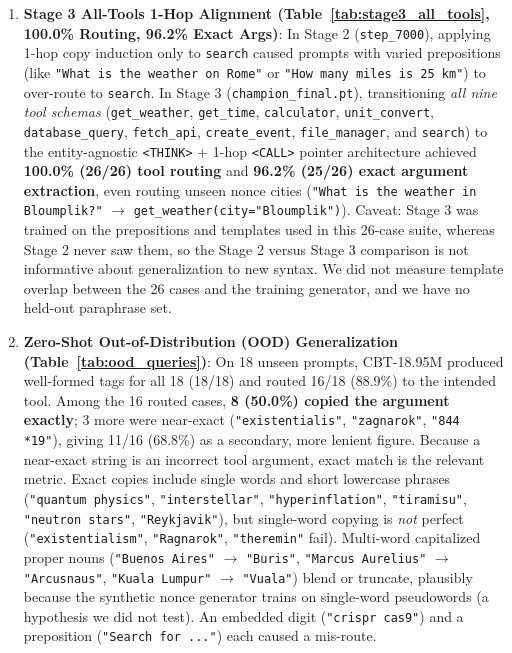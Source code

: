 \documentclass[10pt,twocolumn]{article}
\begin{document}
\begin{enumerate}[leftmargin=*,nosep]
    \item \textbf{Stage 3 All-Tools 1-Hop Alignment (Table~\ref{tab:stage3_all_tools}, 100.0\% Routing, 96.2\% Exact Args)}: In Stage 2 (\texttt{step\_7000}), applying 1-hop copy induction only to \texttt{search} caused prompts with varied prepositions (like \texttt{"What is the weather on Rome"} or \texttt{"How many miles is 25 km"}) to over-route to \texttt{search}. In Stage 3 (\texttt{champion\_final.pt}), transitioning \emph{all nine tool schemas} (\texttt{get\_weather}, \texttt{get\_time}, \texttt{calculator}, \texttt{unit\_convert}, \texttt{database\_query}, \texttt{fetch\_api}, \texttt{create\_event}, \texttt{file\_manager}, and \texttt{search}) to the entity-agnostic \texttt{<THINK>} + 1-hop \texttt{<CALL>} pointer architecture achieved \textbf{100.0\% (26/26) tool routing} and \textbf{96.2\% (25/26) exact argument extraction}, even routing unseen nonce cities (\texttt{"What is the weather in Bloumplik?"} $\to$ \texttt{get\_weather(city="Bloumplik")}). Caveat: Stage 3 was trained on the prepositions and templates used in this 26-case suite, whereas Stage 2 never saw them, so the Stage 2 versus Stage 3 comparison is not informative about generalization to new syntax. We did not measure template overlap between the 26 cases and the training generator, and we have no held-out paraphrase set.
    \item \textbf{Zero-Shot Out-of-Distribution (OOD) Generalization (Table~\ref{tab:ood_queries})}: On 18 unseen prompts, CBT-18.95M produced well-formed tags for all 18 (18/18) and routed 16/18 (88.9\%) to the intended tool. Among the 16 routed cases, \textbf{8 (50.0\%) copied the argument exactly}; 3 more were near-exact (\texttt{"existentialis"}, \texttt{"zagnarok"}, \texttt{"844 *19"}), giving 11/16 (68.8\%) as a secondary, more lenient figure. Because a near-exact string is an incorrect tool argument, exact match is the relevant metric. Exact copies include single words and short lowercase phrases (\texttt{"quantum physics"}, \texttt{"interstellar"}, \texttt{"hyperinflation"}, \texttt{"tiramisu"}, \texttt{"neutron stars"}, \texttt{"Reykjavik"}), but single-word copying is \emph{not} perfect (\texttt{"existentialism"}, \texttt{"Ragnarok"}, \texttt{"theremin"} fail). Multi-word capitalized proper nouns (\texttt{"Buenos Aires"} $\to$ \texttt{"Buris"}, \texttt{"Marcus Aurelius"} $\to$ \texttt{"Arcusnaus"}, \texttt{"Kuala Lumpur"} $\to$ \texttt{"Vuala"}) blend or truncate, plausibly because the synthetic nonce generator trains on single-word pseudowords (a hypothesis we did not test). An embedded digit (\texttt{"crispr cas9"}) and a preposition (\texttt{"Search for ..."}) each caused a mis-route.
\end{enumerate}
\end{document}

